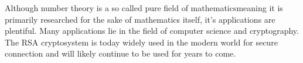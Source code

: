 
Although number theory is a so called pure field of mathematics\textemdash meaning it is primarily researched for the sake of mathematics itself, it's applications are plentiful. Many applications lie in the field of computer science and cryptography. The RSA cryptosystem is today widely used in the modern world for secure connection and will likely continue to be used for years to come.